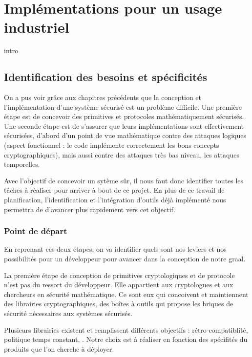 \chapter{Implémentations pour un usage industriel}
\label{chap:erysichtonConception}


intro

\section{Identification des besoins et spécificités}

On a pus voir grâce aux chapitres précédents que la conception et l'implémentation d'une système sécurisé est un problème difficile. Une première étape est de concevoir des primitives et protocoles mathématiquement sécurisés. Une seconde étape est de s’assurer que leurs implémentations sont effectivement sécurisées, d’abord d’un point de vue mathématique contre des attaques logiques (aspect fonctionnel : le code implémente correctement les bons concepts cryptographiques), mais aussi contre des attaques très bas niveau, les attaques temporelles. \medbreak

Avec l'objectif de concevoir un sytème sûr, il nous faut donc identifier toutes les tâches à réaliser pour arriver à bout de ce projet. En plus de ce travail de planification, l'identification et l'intégration d'outils déjà implémenté nous permettra de d'avancer plus rapidement vers cet objectif.\smallbreak


\subsection*{Point de départ}

En reprenant ces deux étapes, on va identifier quels sont nos leviers et nos possibilités pour un développeur pour avancer dans la conception de notre graal.\smallbreak

La première étape de conception de primitives cryptologiques et de protocole n'est pas du ressort du développeur. Elle appartient aux cryptologues et aux chercheurs en sécurité mathématique. Ce sont eux qui concoivent et maintiennent des librairies cryptographiques, des boîtes à outils qui propose les briques de sécurité nécessaires aux systèmes sécurisés.\medbreak

Plusieurs librairies existent \cite{OpenSSL, BearSSL, polubelova2020haclxn} et remplissent différents objectifs :  rétro-compatiblité, politique temps constant, \etc. Notre choix est à réaliser en fonction des spécifités du produits que l'on cherche à déployer.\medbreak

